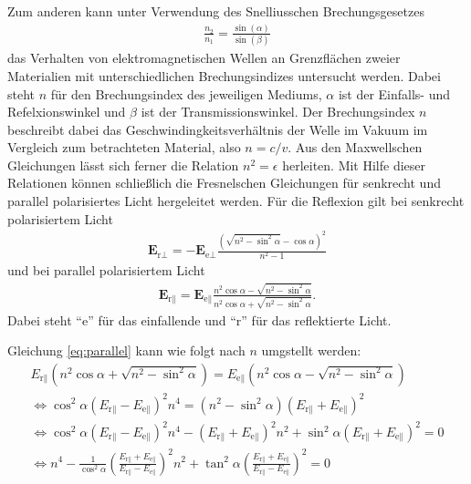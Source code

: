 \noindent
Zum anderen kann unter Verwendung des Snelliusschen Brechungsgesetzes
\begin{align}
    \frac{n_2}{n_1} = \frac{\sin(\alpha)}{\sin(\beta)}
    \label{eq:snellius}
\end{align}
das Verhalten von elektromagnetischen Wellen an Grenzflächen zweier Materialien mit unterschiedlichen Brechungsindizes untersucht werden.
Dabei steht $n$ für den Brechungsindex des jeweiligen Mediums, $\alpha$ ist der Einfalls- und Refelxionswinkel und $\beta$ ist der Transmissionswinkel.
Der Brechungsindex $n$ beschreibt dabei das Geschwindingkeitsverhältnis der Welle im Vakuum im Vergleich zum betrachteten Material, also $n = c/v$.
Aus den Maxwellschen Gleichungen lässt sich ferner die Relation $n^2 = \epsilon$ herleiten.
Mit Hilfe dieser Relationen können schließlich die Fresnelschen Gleichungen für senkrecht und parallel polarisiertes Licht hergeleitet werden.
Für die Reflexion gilt bei senkrecht polarisiertem Licht
\begin{align}
    \symbf{E}_{\text{r}\perp} = - \symbf{E}_{\text{e}\perp} \frac{\left(\sqrt{n^2 -\sin^2\alpha} - \cos{\alpha}\right)^2}{n^2 - 1}
    \label{eq:senkrecht}
\end{align}
und bei parallel polarisiertem Licht
\begin{align}
    \symbf{E}_{\text{r}\parallel} = \symbf{E}_{\text{e}\parallel} \frac{n^2 \cos\alpha - \sqrt{n^2 - \sin^2\alpha}}{n^2 \cos\alpha + \sqrt{n^2 - \sin^2\alpha}}.
    \label{eq:parallel}
\end{align}
Dabei steht \enquote{e} für das einfallende und \enquote{r} für das reflektierte Licht.

\noindent
Gleichung \eqref{eq:parallel} kann wie folgt nach $n$ umgstellt werden:
\begin{align*}
    E_{\text{r}\parallel} \left(n^2 \cos\alpha + \sqrt{n^2 - \sin^2\alpha}\right) 
    = E_{\text{e}\parallel} \left(n^2 \cos\alpha - \sqrt{n^2 - \sin^2\alpha}\right) \\
%
    \iff \cos^2\alpha \left(E_{\text{r}\parallel} - E_{\text{e}\parallel}\right)^2 n^4 
    = \left(n^2 - \sin^2\alpha\right) \left(E_{\text{r}\parallel} + E_{\text{e}\parallel}\right)^2 \\
%
    \iff \cos^2\alpha \left(E_{\text{r}\parallel} - E_{\text{e}\parallel}\right)^2 n^4
    - \left(E_{\text{r}\parallel} + E_{\text{e}\parallel}\right)^2 n^2 
    + \sin^2\alpha \left(E_{\text{r}\parallel} + E_{\text{e}\parallel}\right)^2  = 0\\ 
%
    \iff n^4 - \frac{1}{\cos^2\alpha} \left(\frac{E_{\text{r}\parallel} + E_{\text{e}\parallel}}
    {E_{\text{r}\parallel} - E_{\text{e}\parallel}}\right)^2 n^2
    + \tan^2\alpha \left(\frac{E_{\text{r}\parallel} + E_{\text{e}\parallel}}
    {E_{\text{r}\parallel} - E_{\text{e}\parallel}}\right)^2 = 0\\
\end{align*} 
